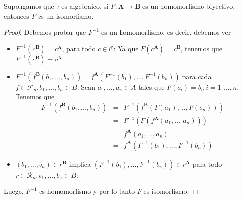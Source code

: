   \begin{lemma} \label{lemma_50}
    \PN Supongamos que $\tau$ es algebraico, si $F: \mathbf{A} \rightarrow \mathbf{B}$ es un homomorfismo biyectivo,
    entonces $F$ es un isomorfismo.
  \end{lemma}
  \begin{proof}
    \PN Debemos probar que $F^{-1}$ es un homomorfismo, es decir, debemos ver
    \begin{itemize}
      \item $F^{-1}(c^{\mathbf{B}}) = c^{\mathbf{A}}$, para todo $c \in \mathcal{C}$: Ya que $F(c^{\mathbf{A}}) =
        c^{\mathbf{B}}$, tenemos que $F^{-1}(c^{\mathbf{B}}) = c^{\mathbf{A}}$
      \item $F^{-1}(f^{\mathbf{B}}(b_{1}, \dotsc, b_{n})) = f^{\mathbf{A}}(F^{-1}(b_{1}), \dotsc, F^{-1}(b_{n}))$ para
        cada $f \in \mathcal{F}_{n}, b_{1}, \dotsc, b_{n} \in B$: Sean $a_{1}, \dotsc, a_{n} \in A$ tales que
        $F(a_{i}) = b_{i}, i = 1, \dotsc, n$. Tenemos que
        \begin{eqnarray*}
          F^{-1}(f^{\mathbf{B}}(b_{1}, \dotsc, b_{n})) &=& F^{-1}(f^{\mathbf{B}}(F(a_{1}), \dotsc, F(a_{n}))) \\
          &=& F^{-1}(F(f^{\mathbf{A}}(a_{1}, \dotsc, a_{n}))) \\
          &=& f^{\mathbf{A}}(a_{1}, \dotsc, a_{n}) \\
          &=& f^{\mathbf{A}}(F^{-1}(b_{1}), \dotsc, F^{-1}(b_{n}))
        \end{eqnarray*}
      \item $(b_{1}, \dotsc, b_{n}) \in r^{\mathbf{B}}$ implica $(F^{-1}(b_{1}), \dotsc, F^{-1}(b_{n})) \in
        r^{\mathbf{A}}$ para todo $r \in \mathcal{R}_{n}, b_{1}, \dotsc, b_{n} \in B$:
    \end{itemize}
    \PN Luego, $F^{-1}$ es homomorfismo y por lo tanto $F$ es isomorfismo.
  \end{proof}

